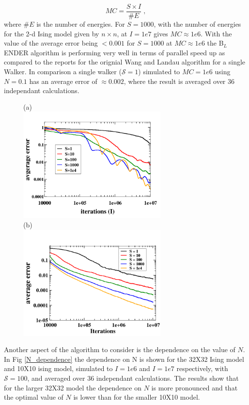 \documentclass[aps,prl,reprint,superscriptaddress,showkeys]{revtex4-1}
\begin{document}
\begin{equation}
MC = \frac{S\times I}{\#E} \;,
\end{equation} 
where $\#E$ is the number of energies.  For $S=1000$, with the number of energies for the 2-d Ising model given by $n\times n$, at $I=1e7$ gives $MC \approx 1e6$. With the value of the average error being $<0.001$ for $S=1000$ at $MC\approx 1e6$ the B$_L$ENDER algorithm is performing very well in terms of parallel speed up as compared to the reports for the orignial Wang and Landau algorithm for a single Walker.  In comparison a single walker ($\mathcal{S}=1$) simulated to $MC = 1e6$ using $N=0.1$ has an average error of $\approx 0.002$, where the result is averaged over 36 independant calculations.
\begin{figure}
(a)\\
\includegraphics[width=7.5cm]{./figures/thirtytwo_root0_1_varyS.png}\\
(b)\\
\includegraphics[width=7.5cm]{./figures/10X10_root1_varyS.png}
\caption{\label{thirtytwo_Stest}}
\end{figure}

Another aspect of the algorithm to consider is the dependence on the value of $N$. In Fig \ref{N_dependence} the dependence on N is shown for  the 32X32 Ising model and  10X10 ising model, simulated to $I=1e6$ and $I=1e7$ respectively, with $\mathcal{S}=100$, and averaged over 36 independant calculations. The results show that for the larger 32X32 model the dependence on $N$ is more pronounced and that the optimal value of $N$ is lower than for the smaller 10X10 model. 
\end{document}
